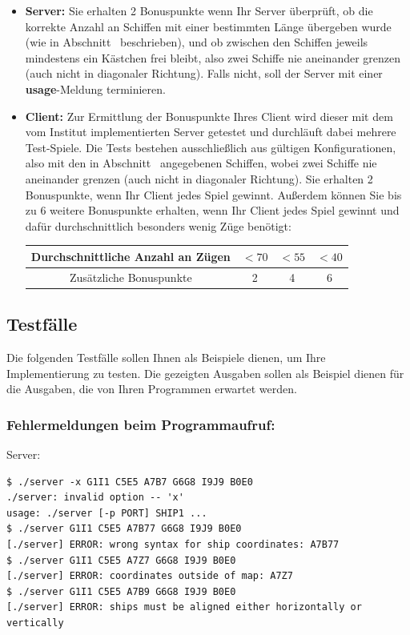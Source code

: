 \begin{itemize}
    \item \textbf{Server:} Sie erhalten 2 Bonuspunkte wenn Ihr Server überprüft,
    ob die korrekte Anzahl an Schiffen mit einer bestimmten Länge übergeben wurde (wie in Abschnitt~ beschrieben),
    und ob zwischen den Schiffen jeweils mindestens ein Kästchen frei bleibt, also zwei Schiffe nie aneinander grenzen
    (auch nicht in diagonaler Richtung). Falls nicht, soll der Server mit einer \textbf{usage}-Meldung terminieren.
    \item \textbf{Client:} Zur Ermittlung der Bonuspunkte Ihres Client wird dieser mit dem vom Institut implementierten Server getestet
    und durchläuft dabei mehrere Test-Spiele. Die Tests bestehen ausschließlich aus gültigen Konfigurationen,
    also mit den in Abschnitt~ angegebenen Schiffen,
    wobei zwei Schiffe nie aneinander grenzen (auch nicht in diagonaler Richtung).
    Sie erhalten 2 Bonuspunkte, wenn Ihr Client jedes Spiel gewinnt.
    Außerdem können Sie bis zu 6 weitere Bonuspunkte erhalten,
    wenn Ihr Client jedes Spiel gewinnt und dafür durchschnittlich besonders wenig Züge benötigt:

    \vspace{3pt}
    {\centering
    \begin{tabular}{| c | c | c | c |}
    \hline
    Durchschnittliche Anzahl an Zügen & $<70$ & $<55$ & $<40$ \\
    \hline
    Zusätzliche Bonuspunkte & 2 & 4 & 6 \\
    \hline
    \end{tabular} \par
    }
\end{itemize}

\subsection*{Testfälle}
\label{sec:testcases}

Die folgenden Testfälle sollen Ihnen als Beispiele dienen, um Ihre Implementierung zu testen.
Die gezeigten Ausgaben sollen als Beispiel dienen für die Ausgaben, die von Ihren Programmen erwartet werden.

\subsubsection*{Fehlermeldungen beim Programmaufruf:}
\vspace{-10pt}
Server:
\vspace{-10pt}
\begin{verbatim}
$ ./server -x G1I1 C5E5 A7B7 G6G8 I9J9 B0E0
./server: invalid option -- 'x'
usage: ./server [-p PORT] SHIP1 ...
$ ./server G1I1 C5E5 A7B77 G6G8 I9J9 B0E0
[./server] ERROR: wrong syntax for ship coordinates: A7B77
$ ./server G1I1 C5E5 A7Z7 G6G8 I9J9 B0E0
[./server] ERROR: coordinates outside of map: A7Z7
$ ./server G1I1 C5E5 A7B9 G6G8 I9J9 B0E0
[./server] ERROR: ships must be aligned either horizontally or vertically
\end{verbatim}

